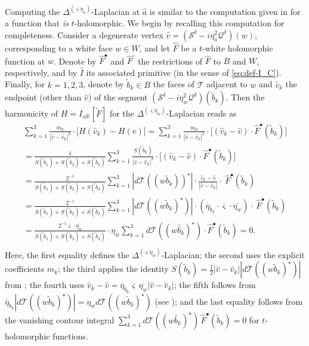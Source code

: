 \documentclass[reqno]{amsart}
\numberwithin{equation}{section}
\theoremstyle{definition}
\theoremstyle{remark}
\newcommand\R{\mathbb{R}}
\newcommand\cT{\mathcal{T}}
\begin{document}
Computing the $\Delta^{(\overline{\varsigma \eta_a})}$-Laplacian at $\hat{a}$ is similar to the computation given in \cite[Definition~4.12]{CLR1} for a function that \emph{is} $t$-holomorphic. We begin by recalling this computation for completeness. Consider a degenerate vertex $\widehat{v} = (\mathcal{S}^\delta - i\overline{\eta}_a^{2}\mathcal{Q}^\delta)(w)$, corresponding to a white face $w \in W$, and let $\widehat{F}$ be a $t$-white holomorphic function at $w$. Denote by $\widehat{F}^\bullet$ and $\widehat{F}^\circ$ the restrictions of $\widehat{F}$ to $B$ and $W$, respectively, and by $\widehat{I}$ its associated primitive (in the sense of \eqref{eq:def-I_C}). Finally, for $k=1,2,3$, denote by $\widetilde{b}_k\in B$ the faces of $\cT$ adjacent to $w$ and $\hat{v}_k$ the endpoint (other than $\widehat{v}$) of the segment $(\mathcal{S}^\delta-i\overline{\eta}^2_w \mathcal{Q}^\delta)(\tilde{b}_k)$. Then the harmonicity of $ H=  I_{\alpha\R}[\tilde{F}]$ for the $\Delta^{(\overline{\varsigma\eta_w})}$-Laplacian reads as
\begin{multline*}
	 \sum\limits_{k=1}^{3} \frac{m_k}{|\widehat{v}-\widehat{v}_k|^2}\cdot\big[ H(\widehat{v}_k)-H(v) \big] =  \sum\limits_{k=1}^{3} \frac{m_k}{|\widehat{v}-\hat{v}_k|^2}\cdot \big[(\widehat{v}_k - \widehat{v})\cdot \hat{F}^\bullet(\tilde{b}_k) \big] \\
 =\frac{1}{S(\widetilde{b}_1)+S(\widetilde{b}_2)+S(\widetilde{b}_3)}\sum\limits_{k=1}^{3} \frac{S(\tilde{b}_k)}{|\widehat{v}-\hat{v}_k|^2}\cdot \big[ (\widehat{v}_k - \widehat{v})\cdot \widehat{F}^\bullet(\widetilde{b}_k) \big]\\
 =\frac{2^{-1}}{S(\widetilde{b}_1)+S(\widetilde{b}_2)+S(\widetilde{b}_3)}\sum\limits_{k=1}^{3} |d\cT ((w\tilde{b}_k) )^\star |\cdot \frac{\widehat{v}_k - \widehat{v}}{|\widehat{v}-\widehat{v}_k|}\cdot \ \widehat{F}^\bullet(\widetilde{b}_k) \\
 =\frac{2^{-1}}{S(\widetilde{b}_1)+S(\widetilde{b}_2)+S(\widetilde{b}_3)}\sum\limits_{k=1}^{3} |d\cT((w\widetilde{b}_k )^\star) |\cdot (\overline{\eta}_{b_k} \cdot \overline{\varsigma} \cdot \overline{\eta_w})\cdot \ \widehat{F}^\bullet(\widetilde{b}_k) \\
  =\frac{2^{-1} \overline{\varsigma} \cdot \overline{\eta_w}  }{S(\widetilde{b}_1)+S(\widetilde{b}_2)+S(\widetilde{b}_3)} \cdot \eta_w\sum\limits_{k=1}^{3} d\cT((w\widetilde{b_k})^\star)\cdot  \widehat{F}^\bullet(\widetilde{b}_k)=0.\\
\end{multline*}
 Here, the first equality defines the $\Delta^{(\overline{\varsigma\eta_w})}$-Laplacian; the second uses the explicit coefficients $m_k$; the third applies the identity $S(\widetilde{b}_k)=\tfrac{1}{2}|\widehat{v}-\widehat{v}_k||d\cT((w\widetilde{b}_k)^\star)|$ from \cite[Fig.~7(right)]{CLR1}; the fourth uses $\widehat{v}_k-\widehat{v}= \overline{\eta}_{b_k}\overline{\varsigma}\,\overline{\eta_w}|\widehat{v}-\widehat{v}_k|$; the fifth follows from $\overline{\eta}_{b_k}|d\cT((w\widetilde{b}_k)^\star)|=\eta_w d\cT((w\widetilde{b}_k)^\star)$ (see \cite[Def.~2.4]{CLR1}); and the last equality follows from the vanishing contour integral $\sum_{k=1}^{3} d\cT((w\widetilde{b_k})^\star)\,\widehat{F}^\bullet(\widetilde{b}_k)=0$ for $t$-holomorphic functions.
 
\end{document}

